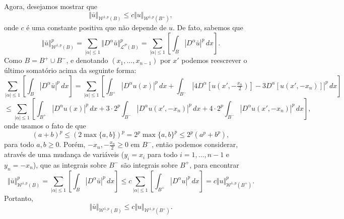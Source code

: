 \documentclass[a4paper, 11pt]{book}
\theoremstyle{definition}
\newcommand{\cL}{\mathcal{L}}
\newcommand{\cW}{\mathcal{W}}
\begin{document}
\begin{prf}
    Agora, desejamos mostrar que 
    \begin{equation} \label{eq:desigualdade-B-Bmais}
        \Vert \bar u \Vert_{\cW^{1,p}(B)} \leqslant c \Vert u \Vert_{\cW^{1,p}(B^+)},
    \end{equation}
    onde $c$ é uma constante positiva que não depende de $u$.
    De fato, sabemos que
    \[
        \Vert \bar u \Vert_{\cW^{1,p}(B)}^p = \sum_{|\alpha| \leqslant 1} \Vert D^\alpha\bar u \Vert_{\cL^P(B)}^p = \sum_{|\alpha| \leqslant 1} \left[\int_B |D^\alpha \bar u| ^p \,dx\right].
    \]
    Como $B = B^+ \cup B^-$, e denotando $(x_1,\dots,x_{n-1})$ por $x'$ podemos reescrever o último somatório acima da seguinte forma:
    \[
        \sum_{|\alpha| \leqslant 1} \left[\int_B |D^\alpha \bar u| ^p \,dx\right] = \sum_{|\alpha| \leqslant 1} \left[ \int_{B^+} |D^\alpha u(x)|^p \,dx + \int_{B^-} |4D^\alpha [u(x',-\tfrac{x_n}{2})] - 3D^\alpha [u(x',-x_n)] |^p \,dx \right]
    \]
    \[
        \leqslant \sum_{|\alpha| \leqslant 1} \left[ \int_{B^+} |D^\alpha u(x)|^p \,dx + 3 \cdot 2^p\int_{B^-} |D^\alpha u(x',-x_n)|^p \,dx + 4 \cdot 2^p\int_{B^-} |D^\alpha u(x',-x_n)|^p \,dx   \right], 
    \]
    onde usamos o fato de que
    \[
        (a + b)^p \leqslant (2 \max\{a,b\})^p = 2^p \max\{a,b\}^p \leqslant 2^p (a^p + b^p),
    \]
    para todo $a,b \geqslant 0$. Porém, $-x_n, -\tfrac{x_n}{2} \geqslant 0$ em $B^-$, então podemos considerar, através de uma mudança de variáveis ($y_i = x_i$ para todo $i = 1,\dots,n-1$ e $y_n = -x_n$), que as integrais sobre $B^-$ são integrais sobre $B^+$, para encontrar
    \[
        \Vert \bar u \Vert_{\cW^{1,p}(B)}^p = \sum_{|\alpha| \leqslant 1} \left[\int_B |D^\alpha \bar u| ^p \,dx\right] \leqslant c\sum_{|\alpha| \leqslant 1} \left[ \int_{B^+}|D^\alpha u|^p \,dx \right] = c \Vert u \Vert_{\cW^{1,p}(B^+)}^p.
    \]
    Portanto,
    \[
        \Vert \bar u \Vert_{\cW^{1,p}(B)} \leqslant c \Vert u \Vert_{\cW^{1,p}(B^+)}.
    \]


\end{prf}
\end{document}

